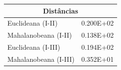  \begin{table}[H]
 	\centering
 	\label{metrica3}
 	\begin{tabular}{|l|l|}
 		\hline
 		\multicolumn{2}{|c|}{Distâncias}  \\ \hline
 		Euclideana (I-II)     & 0.200E+02 \\ \hline
 		Mahalanobeana (I-II)  & 0.138E+02 \\ \hline
 		Euclideana (I-III)    & 0.194E+02 \\ \hline
 		Mahalanobeana (I-III) & 0.352E+01 \\ \hline
 	\end{tabular}
 \end{table}





